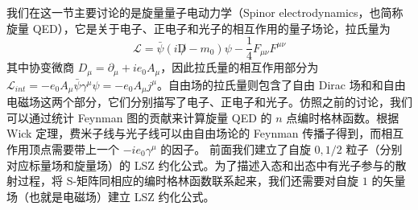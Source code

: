 

我们在这一节主要讨论的是旋量量子电动力学（Spinor electrodynamics，也简称旋量 QED），它是关于电子、正电子和光子的相互作用的量子场论，拉氏量为
\[
\mathcal{L}=\bar{\psi}(i\not D - m_0)\psi - \frac{1}{4}F_{\mu\nu}F^{\mu\nu}
\]
其中协变微商 $D_\mu=\partial_\mu+ie_0 A_\mu$，因此拉氏量的相互作用部分为 $\mathcal{L}_{int}=-e_0 A_\mu \bar\psi \gamma^\mu \psi=-e_0 A_\mu j^{\mu}$。自由场的拉氏量则包含了自由 Dirac 场和和自由电磁场这两个部分，它们分别描写了电子、正电子和光子。仿照之前的讨论，我们可以通过统计 Feynman 图的贡献来计算旋量 QED 的 $n$ 点编时格林函数。根据 Wick 定理，费米子线与光子线可以由自由场论的 Feynman 传播子得到，而相互作用顶点需要带上一个 $-ie_0 \gamma^\mu$ 的因子。
前面我们建立了自旋 $0,1/2$ 粒子（分别对应标量场和旋量场）的 LSZ 约化公式。为了描述入态和出态中有光子参与的散射过程，将 S-矩阵同相应的编时格林函数联系起来，我们还需要对自旋 $1$ 的矢量场（也就是电磁场）建立 LSZ 约化公式。
